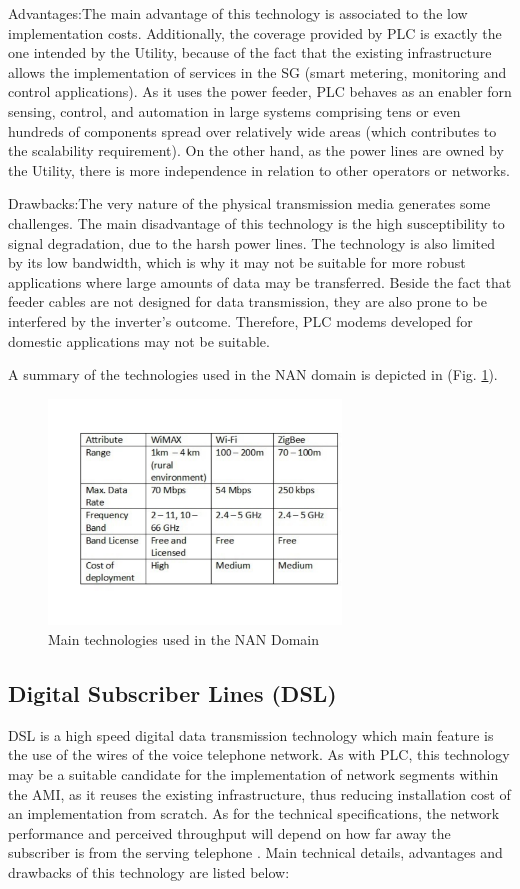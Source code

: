 \documentclass[11pt,draftclsnofoot,onecolumn]{IEEEtran}
\begin{document}
Advantages:The main advantage of this technology is associated to the low implementation costs. Additionally, the coverage provided by PLC is exactly the one intended by the Utility, because of the fact that the existing infrastructure allows the implementation of services in the SG (smart metering, monitoring and control applications). As it uses the power feeder, PLC behaves as an enabler forn sensing, control, and automation in large systems comprising tens or even hundreds of components spread over relatively wide areas (which contributes to the scalability requirement). On the other hand, as the power lines are owned by the Utility, there is more independence in relation to other operators or networks. 

Drawbacks:The very nature of the physical transmission media generates some challenges. The main disadvantage of this technology is the high susceptibility to signal degradation, due to the harsh power lines. The technology is also limited by its low bandwidth, which is why it may not be suitable for more robust applications where large amounts of data may be transferred. Beside the fact that feeder cables are not designed for data transmission, they are also prone to be interfered by the inverter’s outcome. Therefore, PLC modems developed for domestic applications may not be suitable. 

A summary of the technologies used in the NAN domain is depicted in (Fig. \ref{fig:nan}).

\begin{figure}[h!]
\centering
\includegraphics [height=6cm] {NANTechnologies}
\caption{Main technologies used in the NAN Domain}
\label{fig:nan}
\end{figure}


\subsection{Digital Subscriber Lines (DSL)}\label{dsl}
DSL is a high speed digital data transmission technology which main feature is the use of the wires of the voice telephone network. As with PLC, this technology may be a suitable candidate for the implementation of network segments within the AMI, as it reuses the existing infrastructure, thus reducing installation cost of an implementation from scratch. As for the technical specifications, the network performance and perceived throughput will depend on how far away the subscriber is from the serving telephone  \cite{Gungor2011}. Main technical details, advantages and drawbacks of this technology are listed below:
\end{document}

